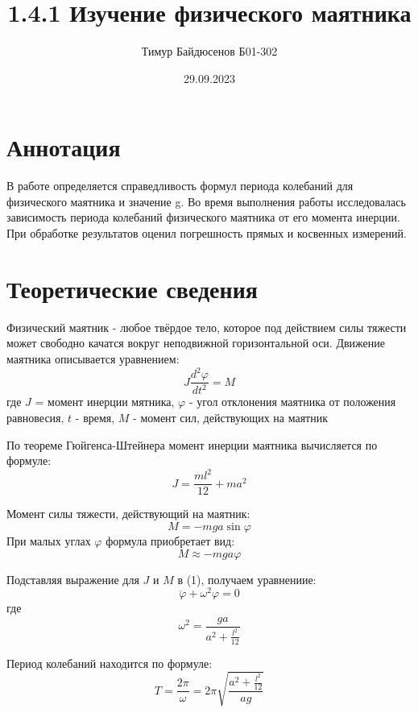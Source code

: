\documentclass[a4paper,12pt]{article}
\title{1.4.1 Изучение физического маятника}
\author{Тимур Байдюсенов Б01-302}
\date{29.09.2023}
\begin{document}
\maketitle

\section{Аннотация}
В работе определяется справедливость формул периода колебаний для физического маятника и значение g. Во время выполнения работы исследовалась зависимость периода колебаний физического маятника от его момента инерции. При обработке результатов оценил погрешность прямых и косвенных измерений.

\section{Теоретические сведения}
Физический маятник - любое твёрдое тело, которое под действием силы тяжести может свободно качатся вокруг неподвижной горизонтальной оси. Движение маятника описывается уравнением:
\begin{equation}
J\frac{d^2\varphi}{dt^2} = M
\end{equation}
где $J$ = момент инерции мятника, $\varphi$ - угол отклонения маятника от положения равновесия, $t$ - время, $M$ - момент сил, действующих на маятник

По теореме Гюйгенса-Штейнера момент инерции маятника вычисляется по формуле:
\begin{equation}
J = \frac{ml^2}{12}+ma^2
\end{equation}

Момент силы тяжести, действующий на маятник:
\begin{equation}
M = -mga\sin\varphi
\end{equation}
При малых углах $\varphi$ формула приобретает вид:
\begin{equation}
M \approx -mga\varphi
\end{equation}

Подставляя выражение для $J$ и $M$ в (1), получаем уравнениие:
\begin{equation}
\ddot{\varphi}+\omega^2\varphi=0
\end{equation}
где 
\begin{equation}
\omega^2 = \frac{ga}{a^2 + \frac{l^2}{12}}
\end{equation}

Период колебаний находится по формуле:
\begin{equation}
T = \frac{2\pi}{\omega} = 2\pi\sqrt{\frac{a^2 + \frac{l^2}{12}}{ag}}
\end{equation}
\end{document}
